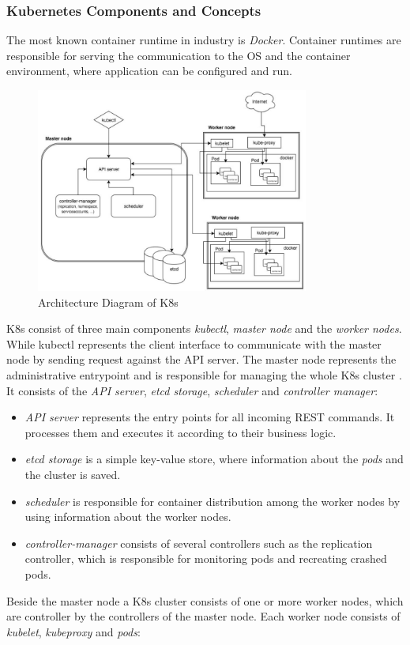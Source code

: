 \subsubsection{Kubernetes Components and Concepts}
The most known container runtime in industry is \textit{Docker}. Container runtimes are responsible for serving the communication to the OS and the container environment, where application can be configured and run.
\begin{figure}
	\centering
	\includegraphics[width=0.8\textwidth]{resources/k8s_architecture}
	\caption{Architecture Diagram of K8s \cite{K8sArch}}
	\label{k8s_architecture}
\end{figure}
K8s consist of three main components \textit{kubectl}, \textit{master node} and the \textit{worker nodes}. While kubectl represents the client interface to communicate with the master node by sending request against the API server. The master node represents the administrative entrypoint and is responsible for managing the whole K8s cluster \cite{K8sArch}. It consists of the \textit{API server}, \textit{etcd storage}, \textit{scheduler} and \textit{controller manager}:

\begin{itemize}
	\item \textit{API server} represents the entry points for all incoming REST commands. It processes them and executes it according to their business logic.
	\item \textit{etcd storage} is a simple key-value store, where information about the \textit{pods} and the cluster is saved.
	\item \textit{scheduler} is responsible for container distribution among the worker nodes by using information about the worker nodes. 
	\item \textit{controller-manager} consists of several controllers such as the replication controller, which is responsible for monitoring pods and recreating crashed pods.
\end{itemize}
Beside the master node a K8s cluster consists of one or more worker nodes, which are controller by the controllers of the master node. Each worker node consists of \textit{kubelet}, \textit{kubeproxy} and \textit{pods}:

